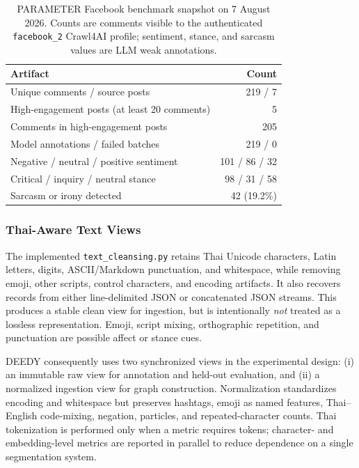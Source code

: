 \documentclass[conference]{IEEEtran}
\begin{document}
\begin{table}[t]
\caption{PARAMETER Facebook benchmark snapshot on 7 August 2026. Counts are
comments visible to the authenticated \texttt{facebook\_2} Crawl4AI profile;
sentiment, stance, and sarcasm values are LLM weak annotations.}
\label{tab:parameter-comments}
\centering
\footnotesize
\begin{tabular}{@{}lr@{}}
\toprule
Artifact & Count \\
\midrule
Unique comments / source posts & 219 / 7 \\
High-engagement posts (at least 20 comments) & 5 \\
Comments in high-engagement posts & 205 \\
Model annotations / failed batches & 219 / 0 \\
Negative / neutral / positive sentiment & 101 / 86 / 32 \\
Critical / inquiry / neutral stance & 98 / 31 / 58 \\
Sarcasm or irony detected & 42 (19.2\%) \\
\bottomrule
\end{tabular}
\end{table}

\subsubsection{Thai-Aware Text Views}

The implemented \texttt{text\_cleansing.py} retains Thai Unicode characters,
Latin letters, digits, ASCII/Markdown punctuation, and whitespace, while
removing emoji, other scripts, control characters, and encoding artifacts. It
also recovers records from either line-delimited JSON or concatenated JSON
streams. This produces a stable clean view for ingestion, but is intentionally
\emph{not} treated as a lossless representation. Emoji, script mixing,
orthographic repetition, and punctuation are possible affect or stance cues.

DEEDY consequently uses two synchronized views in the experimental design:
(i) an immutable raw view for annotation and held-out evaluation, and (ii) a
normalized ingestion view for graph construction. Normalization standardizes
encoding and whitespace but preserves hashtags, emoji as named features,
Thai--English code-mixing, negation, particles, and repeated-character counts.
Thai tokenization is performed only when a metric requires tokens; character-
and embedding-level metrics are reported in parallel to reduce dependence on a
single segmentation system.
\end{document}
